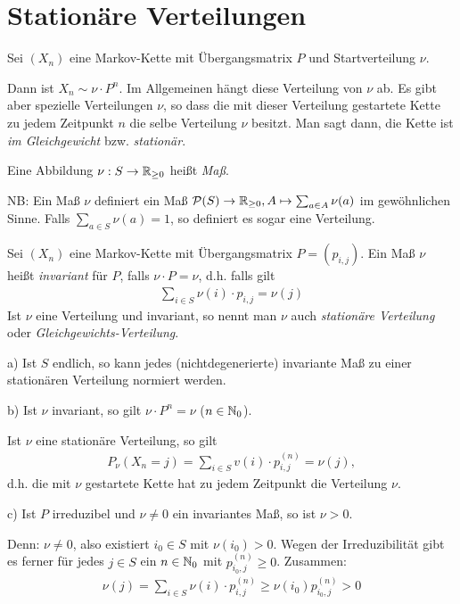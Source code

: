 \documentclass[a4paper,twoside,DIV15,BCOR12mm]{scrbook}
\begin{document}
\section{Stationäre Verteilungen}

Sei $(X_n)$ eine Markov-Kette mit Übergangsmatrix $P$ und Startverteilung $\nu$.

Dann ist $X_n \sim \nu \cdot P^n$. Im Allgemeinen hängt diese Verteilung von $\nu$ ab. Es gibt aber spezielle Verteilungen
$\nu$, so dass die mit dieser Verteilung gestartete Kette zu jedem Zeitpunkt $n$ die selbe Verteilung $\nu$ besitzt. Man sagt dann,
die Kette ist \emph{im Gleichgewicht} bzw. \emph{stationär}.

\begin{definition}
  Eine Abbildung $\nu: S \rightarrow \mathbb{R}_{\geq 0}$ heißt \emph{Maß}.

  NB: Ein Maß $\nu$ definiert ein Maß $\mathcal{P}(S) \rightarrow \mathbb{R}_{\geq 0}, A \mapsto \sum_{a \in A} \nu(a) $ im gewöhnlichen Sinne.
  Falls $\sum_{a \in S} \nu(a) = 1$, so definiert es sogar eine Verteilung.
\end{definition}

\begin{definition}
  Sei $(X_n)$ eine Markov-Kette mit Übergangsmatrix $P = (p_{i,j})$. Ein Maß $\nu$ heißt \emph{invariant} für $P$, falls $\nu \cdot P = \nu$, d.h.
  falls gilt
  \begin{align*}
    \sum_{i \in S} \nu(i) \cdot p_{i,j} = \nu(j)
  \end{align*}
  Ist $\nu$ eine Verteilung und invariant, so nennt man $\nu$ auch \emph{stationäre Verteilung} oder \emph{Gleichgewichts-Verteilung}.
\end{definition}

\begin{bemerkung}
  a) Ist $S$ endlich, so kann jedes (nichtdegenerierte) invariante Maß zu einer stationären Verteilung normiert werden.

  b) Ist $\nu$ invariant, so gilt $\nu \cdot P^n = \nu$ ($n \in \mathbb{N}_0$).

  Ist $\nu$ eine stationäre Verteilung, so gilt
  \begin{align*}
    P_\nu(X_n = j) = \sum_{i \in S} v(i) \cdot p_{i,j}^{(n)} = \nu(j),
  \end{align*}
  d.h. die mit $\nu$ gestartete Kette hat zu jedem Zeitpunkt die Verteilung $\nu$.

  c) Ist $P$ irreduzibel und $\nu \neq 0$ ein invariantes Maß, so ist $\nu > 0$.

  Denn: $\nu \neq 0$, also existiert $i_0 \in S$ mit $\nu(i_0) > 0$.
  Wegen der Irreduzibilität gibt es ferner für jedes $j \in S$ ein $n \in \mathbb{N}_0$ mit $p_{i_0,j}^{(n)} \geq 0$. Zusammen:
  \begin{align*}
    \nu(j) = \sum_{i \in S} \nu(i) \cdot p_{i,j}^{(n)} \geq \nu(i_0) p_{i_0,j}^{(n)} > 0
  \end{align*}
\end{bemerkung}
\end{document}
